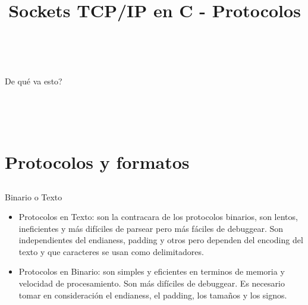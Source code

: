 


\title%
{Sockets TCP/IP en C - Protocolos}


\subject{Sockets TCP/IP en C - Protocolos}




\begin{frame}
   \titlepage
\end{frame}

~%
\begin{frame}{De qu\'e va esto?}
   \tableofcontents
\end{frame}
~%


~%
\section{Protocolos y formatos}
\subsection*{}
\begin{frame}[fragile]{Binario o Texto}
    \begin{itemize}
        \item Protocolos en Texto: son la contracara de los protocolos binarios, son lentos, ineficientes y m\'as dif\'iciles de parsear pero m\'as f\'aciles de debuggear. Son independientes del endianess, padding y otros pero dependen del encoding del texto y que caracteres se usan como delimitadores.
        \item Protocolos en Binario: son simples y eficientes en terminos de memoria y velocidad de procesamiento. Son m\'as dif\'iciles de debuggear. Es necesario tomar en consideraci\'on el endianess, el padding, los tama\~nos y los signos.
    \end{itemize}
\end{frame}

